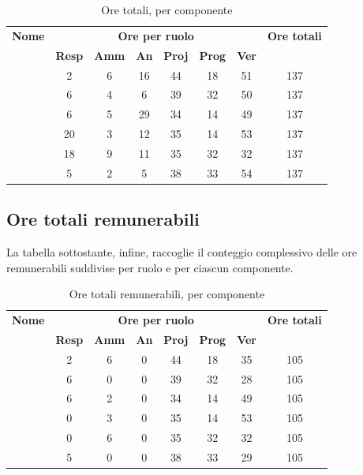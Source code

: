 \begin{table}[H]
	\begin{center}
		\begin{tabular}{|c|c|c|c|c|c|c|c|}
			\hline
			\textbf{Nome} & \multicolumn{6}{c|}{\textbf{Ore per ruolo}} & \textbf{Ore totali} \\\cline{2-7}
			& \textbf{Resp} & \textbf{Amm} & \textbf{An} & \textbf{Proj} & \textbf{Prog} & \textbf{Ver} & \\
			\hline
			\MC			&	2	&	6	&	16	&	44	&	18	&	51	&	137	\\
			\hline
			\AN			&	6	&	4	&	6	&	39	&	32	&	50	& 	137	\\
			\hline
			\DAN		&	6	&	5	&	29	&	34	&	14	&	49	&	137	\\
			\hline
			\AS			&	20	&	3 	&	12 	&	35	&	14 	& 	53	&	137	\\
			\hline
			\NS 		&	18	&	9	&	11	&	35	&	32	& 	32	&	137	\\
			\hline
			\DS			& 	5	&	2	&	5	&	38	&	33	&	54	&	137	\\
			\hline
		\end{tabular}
	\end{center}
	\caption{Ore totali, per componente}
\end{table}

\subsection{Ore totali remunerabili}
La tabella sottostante, infine, raccoglie il conteggio complessivo delle ore remunerabili suddivise per ruolo e per ciascun componente.

\begin{table}[H]
	\begin{center}
		\begin{tabular}{|c|c|c|c|c|c|c|c|}
			\hline
			\textbf{Nome} & \multicolumn{6}{c|}{\textbf{Ore per ruolo}} & \textbf{Ore totali} \\\cline{2-7}
			& \textbf{Resp} & \textbf{Amm} & \textbf{An} & \textbf{Proj} & \textbf{Prog} & \textbf{Ver} & \\
			\hline
			\MC			&	2	&	6	&	0	&	44	&	18	&	35	&	105	\\
			\hline
			\AN			&	6	&	0	&	0	&	39	&	32	&	28	& 	105	\\
			\hline
			\DAN		&	6	&	2	&	0	&	34	&	14	&	49	&	105	\\
			\hline
			\AS			&	0	&	3 	&	0 	&	35	&	14 	& 	53	&	105	\\
			\hline
			\NS 		&	0	&	6	&	0	&	35	&	32	& 	32	&	105	\\
			\hline
			\DS			& 	5	&	0	&	0	&	38	&	33	&	29	&	105	\\
			\hline
		\end{tabular}
	\end{center}
	\caption{Ore totali remunerabili, per componente}
\end{table}
